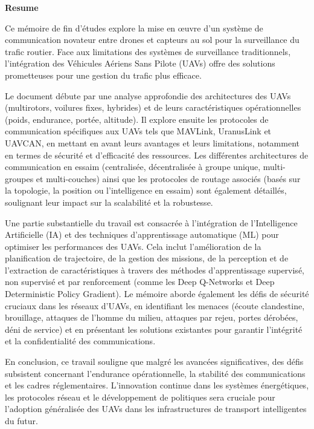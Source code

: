 \vfill{}
\begin{center}
    {
        \Large\bfseries
        Resume  %
    }
\end{center}

Ce mémoire de fin d'études explore la mise en œuvre d'un système de communication novateur entre drones et capteurs au sol pour la surveillance du trafic routier. Face aux limitations des systèmes de surveillance traditionnels, l'intégration des Véhicules Aériens Sans Pilote (UAVs) offre des solutions prometteuses pour une gestion du trafic plus efficace.

Le document débute par une analyse approfondie des architectures des UAVs (multirotors, voilures fixes, hybrides) et de leurs caractéristiques opérationnelles (poids, endurance, portée, altitude). Il explore ensuite les protocoles de communication spécifiques aux UAVs tels que MAVLink, UranusLink et UAVCAN, en mettant en avant leurs avantages et leurs limitations, notamment en termes de sécurité et d'efficacité des ressources. Les différentes architectures de communication en essaim (centralisée, décentralisée à groupe unique, multi-groupes et multi-couches) ainsi que les protocoles de routage associés (basés sur la topologie, la position ou l'intelligence en essaim) sont également détaillés, soulignant leur impact sur la scalabilité et la robustesse.

Une partie substantielle du travail est consacrée à l'intégration de l'Intelligence Artificielle (IA) et des techniques d'apprentissage automatique (ML) pour optimiser les performances des UAVs. Cela inclut l'amélioration de la planification de trajectoire, de la gestion des missions, de la perception et de l'extraction de caractéristiques à travers des méthodes d'apprentissage supervisé, non supervisé et par renforcement (comme les Deep Q-Networks et Deep Deterministic Policy Gradient). Le mémoire aborde également les défis de sécurité cruciaux dans les réseaux d'UAVs, en identifiant les menaces (écoute clandestine, brouillage, attaques de l'homme du milieu, attaques par rejeu, portes dérobées, déni de service) et en présentant les solutions existantes pour garantir l'intégrité et la confidentialité des communications.

En conclusion, ce travail souligne que malgré les avancées significatives, des défis subsistent concernant l'endurance opérationnelle, la stabilité des communications et les cadres réglementaires. L'innovation continue dans les systèmes énergétiques, les protocoles réseau et le développement de politiques sera cruciale pour l'adoption généralisée des UAVs dans les infrastructures de transport intelligentes du futur.

\vfill{}
\pagebreak